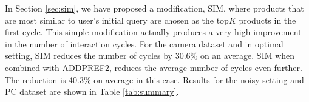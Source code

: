 In Section \ref{sec:sim}, we have proposed a modification, SIM, where products that are most similar to user's initial query are chosen as the top$K$ products in the first cycle.
This simple modification actually produces a very high improvement in the number of interaction cycles.
For the camera dataset and in optimal setting, SIM reduces the number of cycles by 30.6\% on an average.
SIM when combined with ADDPREF2, reduces the average number of cycles even further. 
The reduction is 40.3\% on average in this case.
Results for the noisy setting and PC dataset are shown in Table \ref{tab:summary}.






